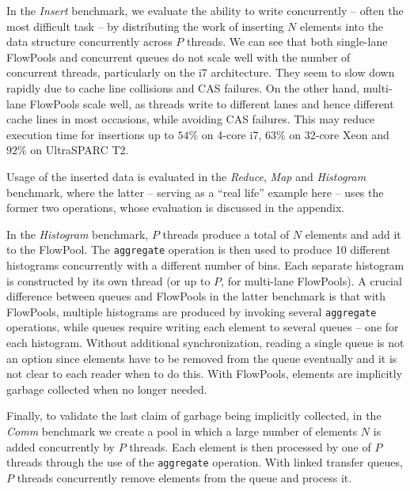 \documentclass[runningheads,a4paper]{llncs}
\begin{document}
In the \emph{Insert} benchmark, we evaluate the ability to write
concurrently -- often the most difficult task -- by distributing the
work of inserting $N$ elements into the data structure concurrently
across $P$ threads.
We can see that both single-lane FlowPools and concurrent queues do
not scale well with the number of concurrent threads, particularly
on the i7 architecture. They seem to slow down rapidly due to cache
line collisions and CAS failures.
On the other hand, multi-lane FlowPools scale well, as threads
write to different lanes and hence different cache lines in
most occasions, while avoiding CAS failures. This may reduce execution
time for insertions up to $54\%$ on 4-core i7, $63\%$ on 32-core 
Xeon and $92\%$ on UltraSPARC T2.

Usage of the inserted data is evaluated in the \emph{Reduce},
\emph{Map} and \emph{Histogram} benchmark, where the latter --
serving as a ``real life'' example here -- uses the former two
operations, whose evaluation is discussed in the appendix.

In the \textit{Histogram} benchmark, $P$ threads produce a total of
$N$ elements and add it to the FlowPool.
The \verb=aggregate= operation is then used to produce 10 different
histograms concurrently with a different number of bins.
Each separate histogram is constructed by its own thread (or up to
$P$, for multi-lane FlowPools).
A crucial difference between queues and FlowPools in the latter
benchmark is that with FlowPools, multiple histograms are produced 
by invoking several \verb=aggregate= operations, while queues require
writing each element to several queues -- one for each histogram.
Without additional synchronization, reading a single queue is not an
option since elements have to be removed from the queue eventually and
it is not clear to each reader when to do this.
With FlowPools, elements are implicitly garbage collected when no
longer needed.

Finally, to validate the last claim of garbage being implicitly
collected, in the \textit{Comm} benchmark we create a pool in which a
large number of elements $N$ is added concurrently by $P$
threads. Each element is then processed by one of $P$ threads through
the use of the \verb=aggregate= operation.
With linked transfer queues, $P$ threads concurrently remove
elements from the queue and process it.
\end{document}
